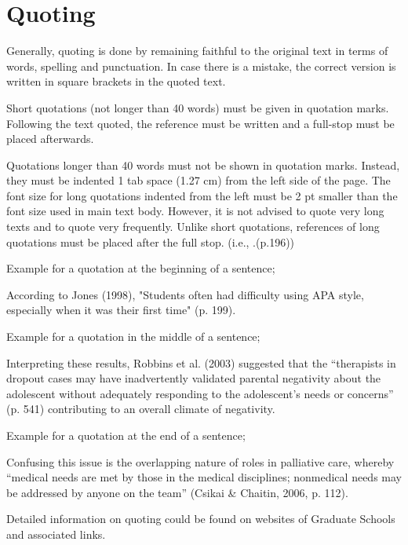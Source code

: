 \section{Quoting}

Generally, quoting is done by remaining faithful to the original text in terms of words, spelling and punctuation. In case there is a mistake, the correct version is written in square brackets in the quoted text.

Short quotations (not longer than 40 words) must be given in quotation marks. Following the text quoted, the reference must be written and a full-stop must be placed afterwards.  

Quotations longer than 40 words must not be shown in quotation  marks. Instead, they must be indented 1 tab space (1.27 cm) from the left side of the page. The font size for long quotations indented from the left must be 2 pt smaller than the font size used in main text body. However, it is not advised to quote very long texts and to quote very frequently. Unlike short quotations, references of long quotations must be placed after the full stop. (i.e., .(p.196))

Example for a quotation at the beginning of a sentence;

According to Jones (1998), "Students often had difficulty using APA style,  especially when it was their first time" (p. 199).

Example for a quotation in the middle of a sentence;

Interpreting these results, Robbins et al. (2003) suggested that the “therapists in dropout cases may have inadvertently validated parental negativity about the adolescent without adequately responding to the adolescent’s needs or concerns” (p. 541) contributing to an overall climate of negativity.

Example for a quotation at the end of a sentence;

Confusing this issue is the overlapping nature of roles in palliative care, whereby “medical needs are met by those in the medical disciplines; nonmedical needs may be addressed by anyone on the team” (Csikai \& Chaitin, 2006, p. 112). 

Detailed information on quoting could be found on websites of Graduate Schools and associated links.
